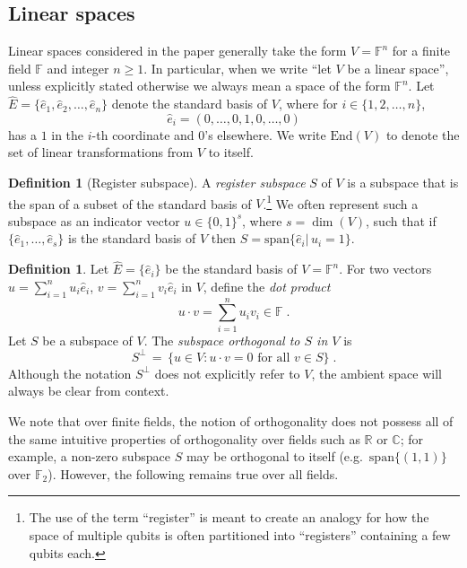 \documentclass[11pt]{article}
\theoremstyle{definition}
\newtheorem{definition}[theorem]{Definition}
\newcommand{\C}{\ensuremath{\mathbb{C}}}
\newcommand{\F}{\ensuremath{\mathbb{F}}}
\newcommand{\R}{\ensuremath{\mathbb{R}}}
\newcommand{\End}{\mathrm{End}}
\begin{document}
\subsection{Linear spaces}
\label{sec:linear-spaces}

Linear spaces considered in the paper generally take the form $V = \F^n$ for a
finite field $\F$ and integer $n \geq 1$.
In particular, when we write ``let $V$ be a linear space'', unless explicitly
stated otherwise we always mean a space of the form $\F^n$.
Let $\hat{E} = \{ \hat{e}_1, \hat{e}_2, \ldots, \hat{e}_n\}$ denote the standard basis of $V$, where for
$i \in\{ 1, 2, \ldots, n\}$,
\begin{equation*}
  \hat{e}_i = (0, \ldots, 0, 1, 0, \ldots, 0)
\end{equation*}
has a $1$ in the $i$-th coordinate and $0$'s elsewhere.
We write $\End(V)$ to denote the set of linear transformations from $V$ to
itself.
\begin{definition}[Register subspace]
  A \emph{register subspace} $S$ of $V$ is a subspace that is the span of a
  subset of the standard basis of $V$.\footnote{The use of the term ``register''
    is meant to create an analogy for how the space of multiple qubits is often
    partitioned into ``registers'' containing a few qubits each.}
  We often represent such a subspace as an indicator vector $u\in \{0,1\}^s$,
  where $s=\dim(V)$, such that if $\{\hat{e}_1,\ldots,\hat{e}_s\}$ is the standard basis of
  $V$ then $S = \text{span}\{\hat{e}_i|\,u_i=1\}$.
\end{definition}

\begin{definition}
  Let $\hat{E} = \{ \hat{e}_i\}$ be the standard basis of $V = \F^n$.
  For two vectors $u = \sum_{i=1}^n u_i \hat{e}_i$, $v = \sum_{i=1}^n v_i \hat{e}_i$ in $V$,
  define the \emph{dot product}
  \begin{equation*}
    u \cdot v = \sum_{i=1}^n u_i v_i \in \F\;.
  \end{equation*}
  Let $S$ be a subspace of $V$. The \emph{subspace orthogonal to $S$ in $V$} is
  \begin{equation*}
    S^\perp \,=\, \big\{ u \in V : u \cdot v = 0
    \text{ for all }  v \in S \big\}\;.
  \end{equation*}
  Although the notation $S^\perp$ does not explicitly refer to $V$, the ambient
  space will always be clear from context.
\end{definition}

We note that over finite fields, the notion of orthogonality does not possess
all of the same intuitive properties of orthogonality over fields such as $\R$
or $\C$; for example, a non-zero subspace $S$ may be orthogonal to itself (e.g.\
$\mathrm{span} \{ (1,1) \}$ over $\F_2$).
However, the following remains true over all fields.
\end{document}
